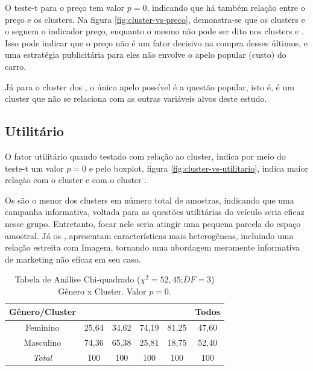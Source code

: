 O teste-t para o preço tem valor $p=0$, indicando que há também relação
entre o preço e os clusters. Na figura \ref{fig:cluster-vs-preco},
demonstra-se que os clusters \emph{\nomeCa{} }e o \emph{\nomeCc{}
}seguem o indicador preço, enquanto o mesmo não pode ser dito nos
clusters \nomeCb{} e \nomeCd{}. Isso pode indicar que o preço não
é um fator decisivo na compra desses últimos, e uma estratégia publicitária
para eles não envolve o apelo popular (custo) do carro.

Já para o cluster dos \nomeCc{}, o único apelo possível é a questão
popular, isto é, é um cluster que não se relaciona com as outras variáveis
alvos deste estudo.

\subsection{Utilitário}

O fator utilitário quando testado com relação ao cluster, indica por
meio do teste-t um valor $p=0$ e pelo boxplot, figura \ref{fig:cluster-vs-utilitario},
indica maior relação com o cluster \emph{\nomeCd{}} e com o cluster
\emph{\nomeCa{}}. 

Os \nomeCd{} são o menor dos clusters em número total de amostras,
indicando que uma campanha informativa, voltada para as questões utilitárias
do veículo seria eficaz nesse grupo. Entretanto, focar nele seria
atingir uma pequena parcela do espaço amostral. Já os \emph{\nomeCa{},
}apresentam características mais heterogêneas, incluindo uma relação
estreita com Imagem, tornando uma abordagem meramente informativa
de marketing não eficaz em seu caso. 

\begin{table}
\begin{centering}
\begin{tabular}{c|c|c|c|c|c}
\hline 
Gênero/Cluster & \nomeCa{} & \nomeCb{} & \nomeCc{} & \nomeCd{} & Todos\tabularnewline
\hline 
Feminino & 25,64 & 34,62 & 74,19 & 81,25 & 47,60\tabularnewline
\hline 
Masculino & 74,36 & 65,38 & 25,81 & 18,75 & 52,40\tabularnewline
\hline 
\emph{Total} & 100 & 100 & 100 & 100 & 100\tabularnewline
\hline 
\end{tabular}
\par\end{centering}

\caption{\label{tab:genero-vs-cluster}Tabela de Análise Chi-quadrado ($\chi^{2}=52,45$;$DF=3$)
Gênero x Cluster. Valor $p=0$.}
\end{table}

